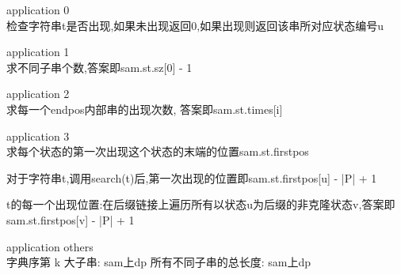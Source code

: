 \item application 0\\
检查字符串t是否出现,如果未出现返回0,如果出现则返回该串所对应状态编号u

\item application 1\\
求不同子串个数,答案即sam.st.sz[0] - 1

\item application 2\\
求每一个endpos内部串的出现次数, 答案即sam.st.times[i]

\item application 3\\
求每个状态的第一次出现这个状态的末端的位置sam.st.firstpos

对于字符串t,调用search(t)后,第一次出现的位置即sam.st.firstpos[u] - |P| + 1

t的每一个出现位置:在后缀链接上遍历所有以状态u为后缀的非克隆状态v,答案即{sam.st.firstpos[v] - |P| + 1}


\item application others\\
字典序第 k 大子串: sam上dp
所有不同子串的总长度: sam上dp